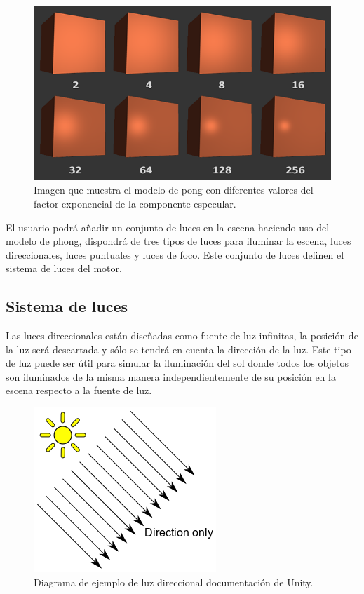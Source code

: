 \documentclass[a4paper, 17pt]{book}
\begin{document}
\begin{figure}[H]
    \centering
    \includegraphics[scale=0.5, keepaspectratio]{img/basic_lighting_specular_shininess.png}
    \caption{Imagen que muestra el modelo de pong con diferentes valores del factor exponencial de la componente especular.}
    \label{figura:Component}
\end{figure}

El usuario podrá añadir un conjunto de luces en la escena haciendo uso del modelo de phong, dispondrá de tres tipos de luces para
iluminar la escena, luces direccionales, luces puntuales y luces de foco. Este conjunto de luces definen el sistema de luces del motor.


\subsection{Sistema de luces} 
\label{sec:Luces}

Las luces direccionales están diseñadas como fuente de luz infinitas, la posición de la luz será descartada y sólo se tendrá en cuenta
la dirección de la luz. Este tipo de luz puede ser útil para simular la iluminación del sol donde todos los objetos son iluminados de
la misma manera independientemente de su posición en la escena respecto a la fuente de luz.

\begin{figure}[H]
    \centering
    \includegraphics[scale=0.5, keepaspectratio]{img/DirectionalLightDiagram.png}
    \caption{ Diagrama de ejemplo de luz direccional documentación de Unity.}
    \label{figura:Component}
\end{figure}
\end{document}
